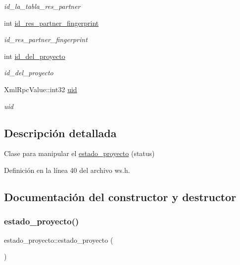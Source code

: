 \begin{DoxyCompactItemize}
\begin{DoxyCompactList}\small\item\em id\+\_\+la\+\_\+tabla\+\_\+res\+\_\+partner \end{DoxyCompactList}\item 
int \hyperlink{classestado__proyecto_afae9b5a359fb7c20ef16050a6cf0cbf7}{id\+\_\+res\+\_\+partner\+\_\+fingerprint}
\begin{DoxyCompactList}\small\item\em id\+\_\+res\+\_\+partner\+\_\+fingerprint \end{DoxyCompactList}\item 
int \hyperlink{classestado__proyecto_af82165bfe4a2b094605bed0955da6b46}{id\+\_\+del\+\_\+proyecto}
\begin{DoxyCompactList}\small\item\em id\+\_\+del\+\_\+proyecto \end{DoxyCompactList}\item 
Xml\+Rpc\+Value\+::int32 \hyperlink{classestado__proyecto_adc11a194fc56d3dffdd269dcd090c762}{uid}
\begin{DoxyCompactList}\small\item\em uid \end{DoxyCompactList}\end{DoxyCompactItemize}


\subsection{Descripción detallada}
Clase para manipular el \hyperlink{classestado__proyecto}{estado\+\_\+proyecto} (status) 

Definición en la línea 40 del archivo ws.\+h.



\subsection{Documentación del constructor y destructor}
\hypertarget{classestado__proyecto_a4a6b71e81903d4b3b729acbfc5b4eef8}{}\label{classestado__proyecto_a4a6b71e81903d4b3b729acbfc5b4eef8} 
\subsubsection{\texorpdfstring{estado\+\_\+proyecto()}{estado\_proyecto()}}
{\footnotesize\ttfamily estado\+\_\+proyecto\+::estado\+\_\+proyecto (\begin{DoxyParamCaption}{ }\end{DoxyParamCaption})}



